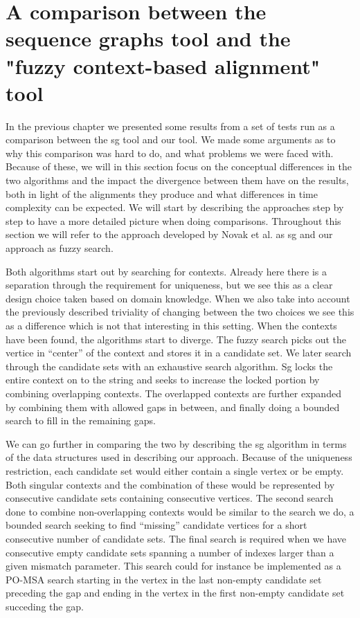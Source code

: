\documentclass[thesis.tex]{subfiles}
\begin{document}
\section{A comparison between the sequence graphs tool and the "fuzzy context-based alignment" tool}
\label{sec:conceptual_comparison}
In the previous chapter we presented some results from a set of tests run as a comparison between the sg tool and our tool. We made some arguments as to why this comparison was hard to do, and what problems we were faced with. Because of these, we will in this section focus on the conceptual differences in the two algorithms and the impact the divergence between them have on the results, both in light of the alignments they produce and what differences in time complexity can be expected. We will start by describing the approaches step by step to have a more detailed picture when doing comparisons. Throughout this section we will refer to the approach developed by Novak et al. as sg and our approach as fuzzy search.\\
\par\noindent
Both algorithms start out by searching for contexts. Already here there is a separation through the requirement for uniqueness, but we see this as a clear design choice taken based on domain knowledge. When we also take into account the previously described triviality of changing between the two choices we see this as a difference which is not that interesting in this setting. When the contexts have been found, the algorithms start to diverge. The fuzzy search picks out the vertice in ``center'' of the context and stores it in a candidate set. We later search through the candidate sets with an exhaustive search algorithm. Sg locks the entire context on to the string and seeks to increase the locked portion by combining overlapping contexts. The overlapped contexts are further expanded by combining them with allowed gaps in between, and finally doing a bounded search to fill in the remaining gaps.\\
\par\noindent
We can go further in comparing the two by describing the sg algorithm in terms of the data structures used in describing our approach. Because of the uniqueness restriction, each candidate set would either contain a single vertex or be empty. Both singular contexts and the combination of these would be represented by consecutive candidate sets containing consecutive vertices. The second search done to combine non-overlapping contexts would be similar to the search we do, a bounded search seeking to find ``missing'' candidate vertices for a short consecutive number of candidate sets. The final search is required when we have consecutive empty candidate sets spanning a number of indexes larger than a given mismatch parameter. This search could for instance be implemented as a PO-MSA search starting in the vertex in the last non-empty candidate set preceding the gap and ending in the vertex in the first non-empty candidate set succeding the gap.\\
\end{document}
